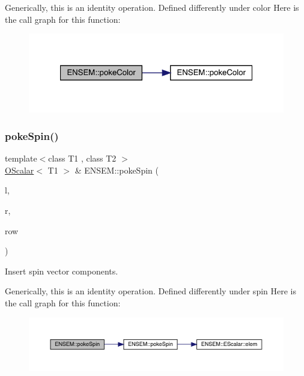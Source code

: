 Generically, this is an identity operation. Defined differently under color Here is the call graph for this function\+:\nopagebreak
\begin{figure}[H]
\begin{center}
\leavevmode
\includegraphics[width=321pt]{d1/d71/group__obsscalar_ga9271cf018f5c0e5f74f6b065b68f91b9_cgraph}
\end{center}
\end{figure}
\mbox{\label{group__obsscalar_ga4ad5af637811a273152545d97b009c62}} 
\subsubsection{\texorpdfstring{pokeSpin()}{pokeSpin()}\hspace{0.1cm}{\footnotesize\ttfamily [1/2]}}
{\footnotesize\ttfamily template$<$class T1 , class T2 $>$ \\
\mbox{\hyperlink{classENSEM_1_1OScalar}{O\+Scalar}}$<$ T1 $>$ \& E\+N\+S\+E\+M\+::poke\+Spin (\begin{DoxyParamCaption}\item[{\mbox{\hyperlink{classENSEM_1_1OScalar}{O\+Scalar}}$<$ T1 $>$ \&}]{l,  }\item[{const \mbox{\hyperlink{classENSEM_1_1OScalar}{O\+Scalar}}$<$ T2 $>$ \&}]{r,  }\item[{int}]{row }\end{DoxyParamCaption})\hspace{0.3cm}{\ttfamily [inline]}}



Insert spin vector components. 

Generically, this is an identity operation. Defined differently under spin Here is the call graph for this function\+:\nopagebreak
\begin{figure}[H]
\begin{center}
\leavevmode
\includegraphics[width=350pt]{d1/d71/group__obsscalar_ga4ad5af637811a273152545d97b009c62_cgraph}
\end{center}
\end{figure}
\mbox{\label{group__obsscalar_gadabf69e63453311d92faee77643c2b7a}} 
